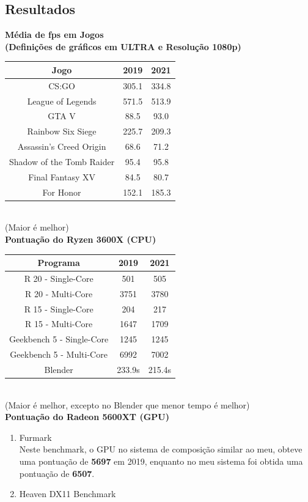 \documentclass{report}
\begin{document}
\subsection{Resultados}
\label{subsect.Resultados}
\begin{center}
\textbf{\Large{Média de \ac{fps} em Jogos}\\\normalsize{(Definições de gráficos em ULTRA e Resolução 1080p)}}
\Large
\begin{tabular}{|c|c|c|}
	\hline
	\textbf{Jogo} & \textbf{2019} & \textbf{2021}\\ \hline
	CS:GO & 305.1 & 334.8\\	\hline
	League of Legends & 571.5 & 513.9\\	\hline
	GTA V & 88.5 & 93.0\\	\hline
	Rainbow Six Siege & 225.7 & 209.3\\	\hline
	Assassin's Creed Origin & 68.6 & 71.2\\	\hline
	Shadow of the Tomb Raider & 95.4 & 95.8\\	\hline
	Final Fantasy XV & 84.5 & 80.7\\	\hline
	For Honor & 152.1 & 185.3\\	\hline
\end{tabular}\\
\small(Maior é melhor)\\
\vspace{1cm}
\textbf{\Large{Pontuação do Ryzen 3600X (\ac{CPU})}}\\
\LARGE
\begin{tabular}{|c|c|c|}
	\hline
	\textbf{Programa} & \textbf{2019} & \textbf{2021}\\ \hline
	R 20 - Single-Core & 501 & 505\\	\hline
	R 20 - Multi-Core & 3751 & 3780\\	\hline
	R 15 - Single-Core & 204 & 217\\	\hline
	R 15 - Multi-Core & 1647 & 1709\\	\hline
	Geekbench 5 - Single-Core & 1245 & 1245\\ \hline
	Geekbench 5 - Multi-Core & 6992 & 7002\\ \hline
	Blender & 233.9s & 215.4s\\ \hline
\end{tabular}\\
\small (Maior é melhor, excepto no Blender que menor tempo é melhor)\\
\vspace{4cm}
\textbf{\Large{Pontuação do Radeon 5600XT (\ac{GPU})}}\\
\large
\begin{enumerate}
	\item Furmark\\
	Neste benchmark, o \ac{GPU} no sistema de composição similar ao meu, obteve uma pontuação de \textbf{5697} em 2019, enquanto no meu sistema foi obtida uma pontuação de \textbf{6507}.
	\item Heaven DX11 Benchmark
	

\end{enumerate}
\end{center}
\end{document}
